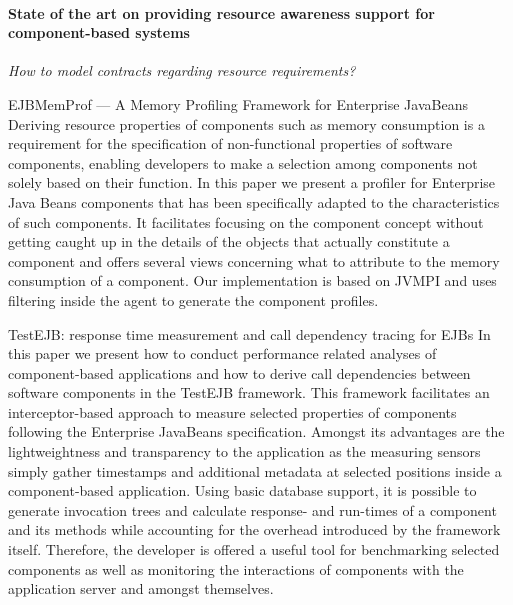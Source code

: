\paragraph{State of the art on providing resource awareness support for component-based systems}

\textit{How to model contracts regarding resource requirements?}

%
%
%
%

EJBMemProf — A Memory Profiling Framework for Enterprise JavaBeans
\cite{Meyerhoefer2005}
Deriving resource properties of components such as memory consumption is a requirement for the specification of non-functional properties of software components, enabling developers to make a selection among components not solely based on their function. In this paper we present a profiler for Enterprise Java Beans components that has been specifically adapted to the characteristics of such components. It facilitates focusing on the component concept without getting caught up in the details of the objects that actually constitute a component and offers several views concerning what to attribute to the memory consumption of a component. Our implementation is based on JVMPI and uses filtering inside the agent to generate the component profiles.

TestEJB: response time measurement and call dependency tracing for EJBs
\cite{Meyerhoefer2007}
In this paper we present how to conduct performance related analyses of component-based applications and how to derive call dependencies between software components in the TestEJB framework. This framework facilitates an interceptor-based approach to measure selected properties of components following the Enterprise JavaBeans specification. Amongst its advantages are the lightweightness and transparency to the application as the measuring sensors simply gather timestamps and additional metadata at selected positions inside a component-based application. Using basic database support, it is possible to generate invocation trees and calculate response- and run-times of a component and its methods while accounting for the overhead introduced by the framework itself. Therefore, the developer is offered a useful tool for benchmarking selected components as well as monitoring the interactions of components with the application server and amongst themselves.



